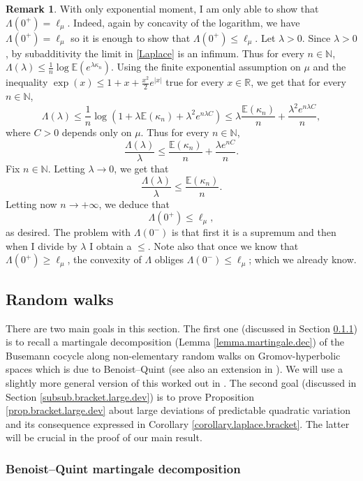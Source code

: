 \documentclass[JEP,XML,SOM,Unicode,published]{cedram}
\theoremstyle{plain}
\theoremstyle{definition}
\newtheorem{remark}[theorem]{Remark}
\newcommand\E{\mathbb{E}}
\newcommand\R{\mathbb{R}}
\newcommand\N{\mathbb{N}}
\begin{document}
\begin{remark}
With only exponential moment, I am only able to show that
$\Lambda(0^+)=\ell_\mu$. Indeed, again by concavity of the logarithm, we have $\Lambda(0^+)=\ell_\mu$ so it is enough to show that $\Lambda(0^+)\leq \ell_\mu$. Let $\lambda>0$.
Since $\lambda>0$, by subadditivity the limit in \eqref{Laplace} is an infimum. Thus for every $n\in \N$,
$\Lambda(\lambda)\leq \frac{1}{n} \log \E(e^{\lambda \kappa_n})$.
Using the finite exponential assumption on $\mu$ and the inequality $\exp(x)\leq 1+x+\frac{x^2}{2} e^{|x|}$ true for every $x\in \R$, we get that for every $n\in \N$,
\[
\Lambda(\lambda)\leq \frac{1}{n} \log(1+ \lambda \E(\kappa_n) + \lambda^2 e^{n \lambda C}) \leq \lambda \frac{\E(\kappa_n)}{n} + \frac{\lambda^2 e^{n \lambda C}}{n},
\]
where $C>0$ depends only on $\mu$.
Thus for every $n\in \N$,
\[
\frac{\Lambda(\lambda)}{\lambda}\leq \frac{\E(\kappa_n)}{n} + \frac{\lambda e^{nC}}{n}.
\]
Fix $n\in \N$. Letting $\lambda\to 0$, we get that
\[
\frac{\Lambda(\lambda)}{\lambda}\leq \frac{\E(\kappa_n)}{n}.
\]
Letting now $n\to +\infty$, we deduce that
\[
\Lambda(0^+)\leq \ell_{\mu},
\]
as desired.
The problem with $\Lambda(0^-)$ is that first it is a supremum and then when I divide by $\lambda$ I obtain a $\leq$. Note also that once we know that $\Lambda(0^+)\geq \ell_{\mu}$, the convexity of $\Lambda$ obliges $\Lambda(0^-)\leq \ell_{\mu}$; which we already know.
\end{remark}
\fi

\subsection{Random walks}
\label{sec.large.deviation}
There are two main goals in this section. The first one (discussed in Section \ref{subsub.mart.dec}) is to recall a martingale decomposition (Lemma \ref{lemma.martingale.dec}) of the Busemann cocycle along non-elementary random walks on Gromov-hyperbolic spaces which is due to Benoist--Quint \cite{BQ.CLT,BQ.hyperbolic} (see also an extension in \cite{horbez}). We will use a slightly more general version of this worked out in \cite{aoun-sert}. The second goal (discussed in Section \ref{subsub.bracket.large.dev}) is to prove Proposition \ref{prop.bracket.large.dev} about large deviations of predictable quadratic variation and its consequence expressed in Corollary \ref{corollary.laplace.bracket}. The latter will be crucial in the proof of our main result.

\subsubsection{Benoist--Quint martingale decomposition}\label{subsub.mart.dec}
\end{document}
